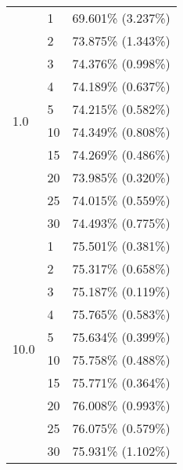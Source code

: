 \documentclass[conference,compsoc]{IEEEtran}
\begin{document}
\begin{table}[ht]
\begin{tabular}{lll}
    \hline
    \multirow{10}{*}{1.0} & 1 & 69.601\% (3.237\%) \\
    & 2 & 73.875\% (1.343\%) \\
    & 3 & 74.376\% (0.998\%) \\
    & 4 & 74.189\% (0.637\%) \\
    & 5 & 74.215\% (0.582\%) \\
    & 10 & 74.349\% (0.808\%) \\
    & 15 & 74.269\% (0.486\%) \\
    & 20 & 73.985\% (0.320\%) \\
    & 25 & 74.015\% (0.559\%) \\
    & 30 & 74.493\% (0.775\%) \\
    \hline
    \multirow{10}{*}{10.0} & 1 & 75.501\% (0.381\%) \\
    & 2 & 75.317\% (0.658\%) \\
    & 3 & 75.187\% (0.119\%) \\
    & 4 & 75.765\% (0.583\%) \\
    & 5 & 75.634\% (0.399\%) \\
    & 10 & 75.758\% (0.488\%) \\
    & 15 & 75.771\% (0.364\%) \\
    & 20 & 76.008\% (0.993\%) \\
    & 25 & 76.075\% (0.579\%) \\
    & 30 & 75.931\% (1.102\%) \\
    \hline
    \end{tabular}
\end{table}
\end{document}

